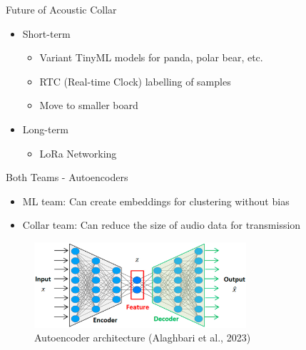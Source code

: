 \begin{frame}{Future of Acoustic Collar}
    \begin{itemize}
        \item Short-term
        \begin{itemize}
            \item Variant TinyML models for panda, polar bear, etc.
            \item RTC (Real-time Clock) labelling of samples
            \item Move to smaller board
        \end{itemize}
        \item Long-term
        \begin{itemize}
            \item LoRa Networking
        \end{itemize}
    \end{itemize}
\end{frame}

\begin{frame}{Both Teams - Autoencoders}
    \begin{itemize}
        \item ML team: Can create embeddings for clustering without bias
        \item Collar team: Can reduce the size of audio data for transmission
    \end{itemize}
    \begin{figure}
        \centering
        \includegraphics[height=0.7\textheight,width=0.7\textwidth,keepaspectratio]{images/autoencoder.png}
        \caption{Autoencoder architecture (Alaghbari et al., 2023)}
    \end{figure}
\end{frame}

